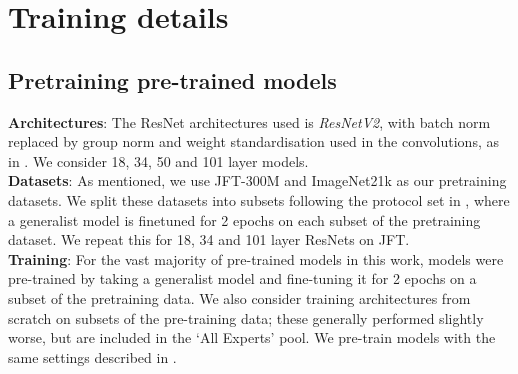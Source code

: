 \documentclass{article} \usepackage{iclr2021_conference,times}
\begin{document}



\newpage
\appendix

\setcounter{topnumber}{5}
\setcounter{bottomnumber}{5}
\setcounter{totalnumber}{10}
\renewcommand{\topfraction}{0.9}
\renewcommand{\bottomfraction}{0.9}
\renewcommand{\textfraction}{0.1}
\renewcommand{\floatpagefraction}{0.9}


\section{Training details}
\subsection{Pretraining pre-trained models}
\label{app:training_fes}
\textbf{Architectures}: The ResNet architectures used is \textit{ResNetV2}, with batch norm replaced by group norm and weight standardisation used in the convolutions, as in \citet{alex2019big}. We consider 18, 34, 50 and 101 layer models.\\ 
\textbf{Datasets}: As mentioned, we use JFT-300M and ImageNet21k as our pretraining datasets. We split these datasets into subsets following the protocol set in \citet{puigcerver2020experts}, where a generalist model is finetuned for 2 epochs on each subset of the pretraining dataset. We repeat this for 18, 34 and 101 layer ResNets on JFT.\\
\textbf{Training}: For the vast majority of pre-trained models in this work, models were pre-trained by taking a generalist model and fine-tuning it for 2 epochs on a subset of the pretraining data. We also consider training architectures from scratch on subsets of the pre-training data; these generally performed slightly worse, but are included in the `All Experts' pool. We pre-train models with the same settings described in \citet{puigcerver2020experts}.
\end{document}
